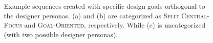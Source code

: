 \begin{figure}[t!]
    \centering
     \hfill
     \hfill
    
    \caption{Example sequences created with specific design goals orthogonal to the designer personas. (a) and (b) are categorized as \textsc{Split Central-Focus} and \textsc{Goal-Oriented}, respectively. While (c) is uncategorized (with two possible designer personas).}
    \label{fig:prelEval}
\end{figure}




